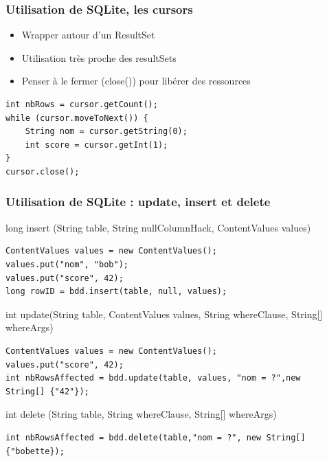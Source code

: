 \documentclass{beamer}
\begin{document}
\begin{frame}[fragile]
\frametitle{Utilisation de SQLite, les cursors}
\begin{itemize}
    \item Wrapper autour d'un ResultSet
    \item Utilisation très proche des resultSets
    \item Penser à le fermer (close()) pour libérer des ressources
\end{itemize}
\begin{lstlisting}
int nbRows = cursor.getCount();
while (cursor.moveToNext()) {
    String nom = cursor.getString(0);
    int score = cursor.getInt(1);
}
cursor.close();
\end{lstlisting}
\end{frame}
\begin{frame}[fragile]
\frametitle{Utilisation de SQLite : update, insert et delete}
long insert (String table, String nullColumnHack, ContentValues values)
\begin{lstlisting}
ContentValues values = new ContentValues();
values.put("nom", "bob");
values.put("score", 42);
long rowID = bdd.insert(table, null, values);
\end{lstlisting}
int update(String table, ContentValues values, String whereClause, String[] whereArgs)
\begin{lstlisting}
ContentValues values = new ContentValues();
values.put("score", 42);
int nbRowsAffected = bdd.update(table, values, "nom = ?",new String[] {"42"});
\end{lstlisting}
int delete (String table, String whereClause, String[] whereArgs)
\begin{lstlisting}
int nbRowsAffected = bdd.delete(table,"nom = ?", new String[] {"bobette});
\end{lstlisting}
\end{frame}
\end{document}
